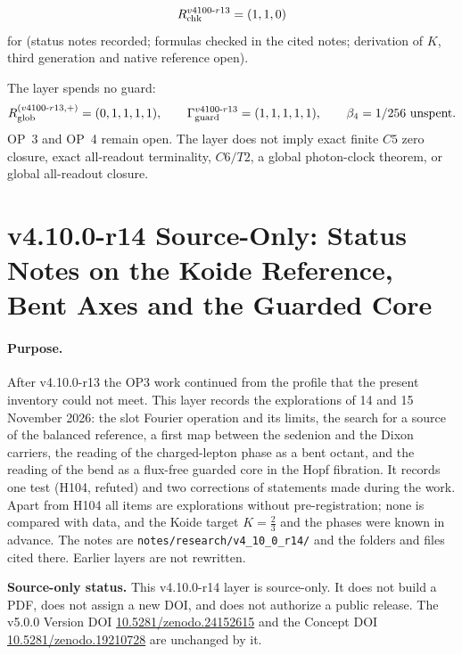 \[
R_{\rm chk}^{v4100\text{-}r13}=(1,1,0)
\]
for (status notes recorded; formulas checked in the cited notes; derivation of \(K\), third generation and native reference
open).

The layer spends no guard:
\[
R_{\rm glob}^{(v4100\text{-}r13,+)}=(0,1,1,1,1),
\qquad
\Gamma_{\rm guard}^{v4100\text{-}r13}=(1,1,1,1,1),
\qquad
\beta_4=1/256\ \text{unspent}.
\]
OP~3 and OP~4 remain open.  The layer does not imply exact finite \(C5\) zero closure, exact all-readout terminality,
\(C6/T2\), a global photon-clock theorem, or global all-readout closure.

\clearpage
\section*{v4.10.0-r14 Source-Only: Status Notes on the Koide Reference, Bent Axes and the Guarded Core}
\label{sec:v4100-r14-bent-axes-guarded-core}

\paragraph{Purpose.}
After v4.10.0-r13 the OP3 work continued from the profile that the present inventory could not meet.  This layer records
the explorations of 14 and 15 November 2026: the slot Fourier operation and its limits, the search for a source of the
balanced reference, a first map between the sedenion and the Dixon carriers, the reading of the charged-lepton phase as a
bent octant, and the reading of the bend as a flux-free guarded core in the Hopf fibration.  It records one test (H104,
refuted) and two corrections of statements made during the work.  Apart from H104 all items are explorations without
pre-registration; none is compared with data, and the Koide target \(K=\tfrac23\) and the phases were known in advance.  The
notes are \texttt{notes/\allowbreak research/\allowbreak v4\_10\_0\_r14/} and the folders and files cited there.  Earlier layers
are not rewritten.

\noindent\textbf{Source-only status.}
This v4.10.0-r14 layer is source-only.  It does not build a PDF, does not assign a new DOI,
and does not authorize a public release.  The v5.0.0 Version DOI
\href{https://doi.org/10.5281/zenodo.24152615}{10.5281/zenodo.24152615} and the Concept DOI
\href{https://doi.org/10.5281/zenodo.19210728}{10.5281/zenodo.19210728} are unchanged by it.

